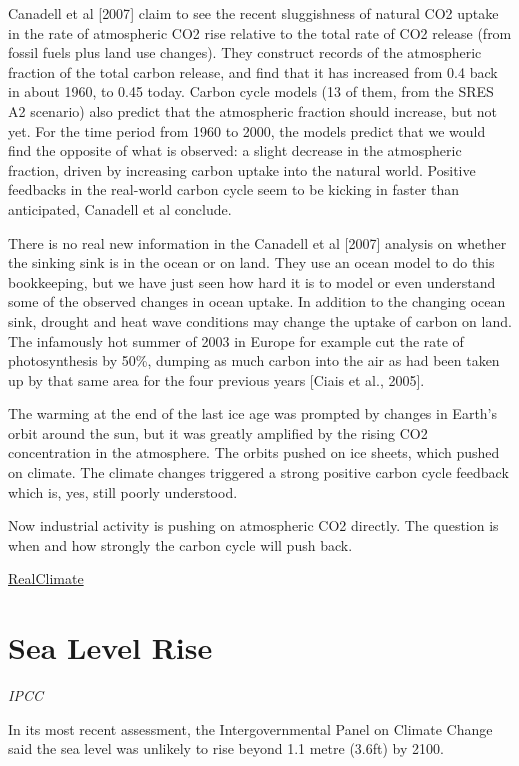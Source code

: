 \documentclass[
]{book}
\begin{document}
Canadell et al {[}2007{]} claim to see the recent sluggishness of natural CO2 uptake in the rate of atmospheric CO2 rise relative to the total rate of CO2 release (from fossil fuels plus land use changes). They construct records of the atmospheric fraction of the total carbon release, and find that it has increased from 0.4 back in about 1960, to 0.45 today. Carbon cycle models (13 of them, from the SRES A2 scenario) also predict that the atmospheric fraction should increase, but not yet. For the time period from 1960 to 2000, the models predict that we would find the opposite of what is observed: a slight decrease in the atmospheric fraction, driven by increasing carbon uptake into the natural world. Positive feedbacks in the real-world carbon cycle seem to be kicking in faster than anticipated, Canadell et al conclude.

There is no real new information in the Canadell et al {[}2007{]} analysis on whether the sinking sink is in the ocean or on land. They use an ocean model to do this bookkeeping, but we have just seen how hard it is to model or even understand some of the observed changes in ocean uptake. In addition to the changing ocean sink, drought and heat wave conditions may change the uptake of carbon on land. The infamously hot summer of 2003 in Europe for example cut the rate of photosynthesis by 50\%, dumping as much carbon into the air as had been taken up by that same area for the four previous years {[}Ciais et al., 2005{]}.

The warming at the end of the last ice age was prompted by changes in Earth's orbit around the sun, but it was greatly amplified by the rising CO2 concentration in the atmosphere. The orbits pushed on ice sheets, which pushed on climate. The climate changes triggered a strong positive carbon cycle feedback which is, yes, still poorly understood.

Now industrial activity is pushing on atmospheric CO2 directly. The question is when and how strongly the carbon cycle will push back.

\href{https://www.realclimate.org/index.php/archives/2007/11/is-the-ocean-carbon-sink-sinking/}{RealClimate}

\hypertarget{sea-level-rise}{%
\section{Sea Level Rise}\label{sea-level-rise}}

\emph{IPCC}

In its most recent assessment, the Intergovernmental Panel on Climate Change said the sea level was unlikely to rise beyond 1.1 metre (3.6ft) by 2100.
\end{document}
